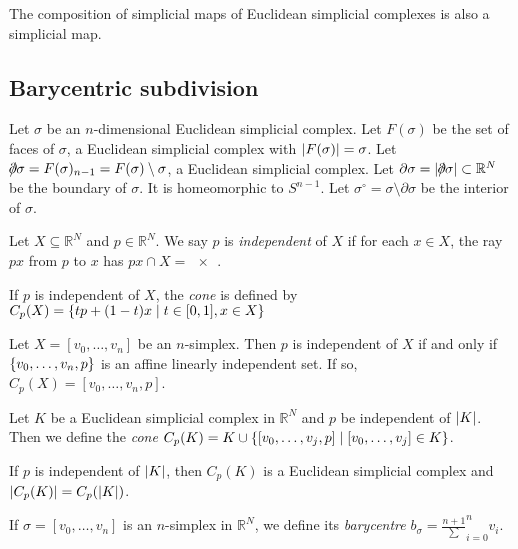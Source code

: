 \begin{remark}
	The composition of simplicial maps of Euclidean simplicial complexes is also a simplicial map.
\end{remark}

\subsection{Barycentric subdivision}
\begin{definition}
	Let \( \sigma \) be an \( n \)-dimensional Euclidean simplicial complex.
	Let \( F(\sigma) \) be the set of faces of \( \sigma \), a Euclidean simplicial complex with \( \abs{F(\sigma)} = \sigma \).
	Let \( \bound \sigma = F(\sigma)_{n-1} = F(\sigma) \setminus \sigma \), a Euclidean simplicial complex.
	Let \( \partial \sigma = \abs{\bound \sigma} \subset \mathbb R^N \) be the boundary of \( \sigma \).
	It is homeomorphic to \( S^{n-1} \).
	Let \( \sigma^\circ = \sigma \setminus \partial \sigma \) be the interior of \( \sigma \).
\end{definition}
\begin{definition}
	Let \( X \subseteq \mathbb R^N \) and \( p \in \mathbb R^N \).
	We say \( p \) is \emph{independent} of \( X \) if for each \( x \in X \), the ray \( px \) from \( p \) to \( x \) has \( px \cap X = \qty{x} \).
\end{definition}
\begin{definition}
	If \( p \) is independent of \( X \), the \emph{cone} is defined by \( C_p(X) = \qty{tp + (1-t)x \mid t \in [0,1], x \in X} \)
\end{definition}
\begin{example}
	Let \( X = [v_0,\dots,v_n] \) be an \( n \)-simplex.
	Then \( p \) is independent of \( X \) if and only if \( \qty{v_0, \dots, v_n, p} \) is an affine linearly independent set.
	If so, \( C_p(X) = [v_0, \dots, v_n, p] \).
\end{example}
\begin{definition}
	Let \( K \) be a Euclidean simplicial complex in \( \mathbb R^N \) and \( p \) be independent of \( \abs{K} \).
	Then we define the \emph{cone} \( C_p(K) = K \cup \qty{[v_0, \dots, v_j, p] \mid [v_0, \dots, v_j] \in K} \).
\end{definition}
\begin{lemma}
	If \( p \) is independent of \( \abs{K} \), then \( C_p(K) \) is a Euclidean simplicial complex and \( \abs{C_p(K)} = C_p(\abs{K}) \).
\end{lemma}
\begin{definition}
	If \( \sigma = [v_0, \dots, v_n] \) is an \( n \)-simplex in \( \mathbb R^N \), we define its \emph{barycentre} \( b_\sigma = \frac{n+1}\sum_{i=0}^n v_i \).
\end{definition}
